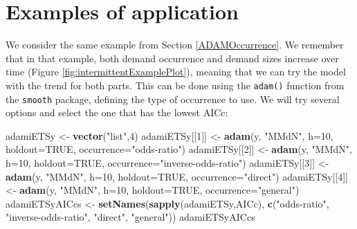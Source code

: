\documentclass[]{book}
\newenvironment{Shaded}{\begin{snugshade}}{\end{snugshade}}
\newcommand{\DataTypeTok}[1]{\textcolor[rgb]{0.13,0.29,0.53}{#1}}
\newcommand{\DecValTok}[1]{\textcolor[rgb]{0.00,0.00,0.81}{#1}}
\newcommand{\KeywordTok}[1]{\textcolor[rgb]{0.13,0.29,0.53}{\textbf{#1}}}
\newcommand{\NormalTok}[1]{#1}
\newcommand{\OtherTok}[1]{\textcolor[rgb]{0.56,0.35,0.01}{#1}}
\newcommand{\StringTok}[1]{\textcolor[rgb]{0.31,0.60,0.02}{#1}}
\theoremstyle{definition}
\theoremstyle{definition}
\theoremstyle{definition}
\theoremstyle{definition}
\theoremstyle{remark}
\begin{document}
\hypertarget{IntermittentExample}{%
\section{Examples of application}\label{IntermittentExample}}

We consider the same example from Section \ref{ADAMOccurrence}. We remember that in that example, both demand occurrence and demand sizes increase over time (Figure \ref{fig:intermittentExamplePlot}), meaning that we can try the model with the trend for both parts. This can be done using the \texttt{adam()} function from the \texttt{smooth} package, defining the type of occurrence to use. We will try several options and select the one that has the lowest AICc:

\begin{Shaded}
\begin{Highlighting}[]
\NormalTok{adamiETSy <-}\StringTok{ }\KeywordTok{vector}\NormalTok{(}\StringTok{"list"}\NormalTok{,}\DecValTok{4}\NormalTok{)}
\NormalTok{adamiETSy[[}\DecValTok{1}\NormalTok{]] <-}\StringTok{ }\KeywordTok{adam}\NormalTok{(y, }\StringTok{"MMdN"}\NormalTok{, }\DataTypeTok{h=}\DecValTok{10}\NormalTok{, }\DataTypeTok{holdout=}\OtherTok{TRUE}\NormalTok{,}
                       \DataTypeTok{occurrence=}\StringTok{"odds-ratio"}\NormalTok{)}
\NormalTok{adamiETSy[[}\DecValTok{2}\NormalTok{]] <-}\StringTok{ }\KeywordTok{adam}\NormalTok{(y, }\StringTok{"MMdN"}\NormalTok{, }\DataTypeTok{h=}\DecValTok{10}\NormalTok{, }\DataTypeTok{holdout=}\OtherTok{TRUE}\NormalTok{,}
                       \DataTypeTok{occurrence=}\StringTok{"inverse-odds-ratio"}\NormalTok{)}
\NormalTok{adamiETSy[[}\DecValTok{3}\NormalTok{]] <-}\StringTok{ }\KeywordTok{adam}\NormalTok{(y, }\StringTok{"MMdN"}\NormalTok{, }\DataTypeTok{h=}\DecValTok{10}\NormalTok{, }\DataTypeTok{holdout=}\OtherTok{TRUE}\NormalTok{,}
                       \DataTypeTok{occurrence=}\StringTok{"direct"}\NormalTok{)}
\NormalTok{adamiETSy[[}\DecValTok{4}\NormalTok{]] <-}\StringTok{ }\KeywordTok{adam}\NormalTok{(y, }\StringTok{"MMdN"}\NormalTok{, }\DataTypeTok{h=}\DecValTok{10}\NormalTok{, }\DataTypeTok{holdout=}\OtherTok{TRUE}\NormalTok{,}
                       \DataTypeTok{occurrence=}\StringTok{"general"}\NormalTok{)}
\NormalTok{adamiETSyAICcs <-}
\StringTok{    }\KeywordTok{setNames}\NormalTok{(}\KeywordTok{sapply}\NormalTok{(adamiETSy,AICc),}
             \KeywordTok{c}\NormalTok{(}\StringTok{"odds-ratio"}\NormalTok{, }\StringTok{"inverse-odds-ratio"}\NormalTok{,}
               \StringTok{"direct"}\NormalTok{, }\StringTok{"general"}\NormalTok{))}
\NormalTok{adamiETSyAICcs}
\end{Highlighting}
\end{Shaded}
\end{document}
